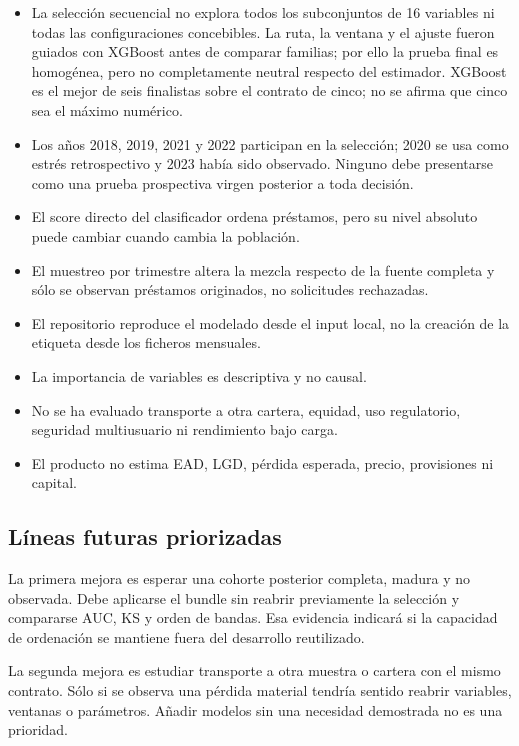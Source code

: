 \documentclass[10pt,a4paper]{article}
\begin{document}
\begin{itemize}\setlength{\itemsep}{2pt}\setlength{\parskip}{0pt}
\item La selección secuencial no explora todos los subconjuntos de 16 variables
ni todas las configuraciones concebibles. La ruta, la ventana y el ajuste fueron
guiados con XGBoost antes de comparar familias; por ello la prueba final es
homogénea, pero no completamente neutral respecto del estimador. XGBoost es el
mejor de seis finalistas sobre el contrato de cinco; no se afirma que cinco sea
el máximo numérico.
\item Los años 2018, 2019, 2021 y 2022 participan en la selección; 2020 se usa
como estrés retrospectivo y 2023 había sido observado. Ninguno debe presentarse
como una prueba prospectiva virgen posterior a toda decisión.
\item El score directo del clasificador ordena préstamos, pero su nivel absoluto puede
cambiar cuando cambia la población.
\item El muestreo por trimestre altera la mezcla respecto de la fuente completa
y sólo se observan préstamos originados, no solicitudes rechazadas.
\item El repositorio reproduce el modelado desde el input local, no la creación
de la etiqueta desde los ficheros mensuales.
\item La importancia de variables es descriptiva y no causal.
\item No se ha evaluado transporte a otra cartera, equidad, uso regulatorio,
seguridad multiusuario ni rendimiento bajo carga.
\item El producto no estima EAD, LGD, pérdida esperada, precio, provisiones ni
capital.
\end{itemize}

\subsection{Líneas futuras priorizadas}

La primera mejora es esperar una cohorte posterior completa, madura y no
observada. Debe aplicarse el bundle sin reabrir previamente la selección y
compararse AUC, KS y orden de bandas. Esa evidencia indicará si la capacidad de
ordenación se mantiene fuera del desarrollo reutilizado.

La segunda mejora es estudiar transporte a otra muestra o cartera con el mismo
contrato. Sólo si se observa una pérdida material tendría sentido reabrir
variables, ventanas o parámetros. Añadir modelos sin una necesidad demostrada
no es una prioridad.
\end{document}
